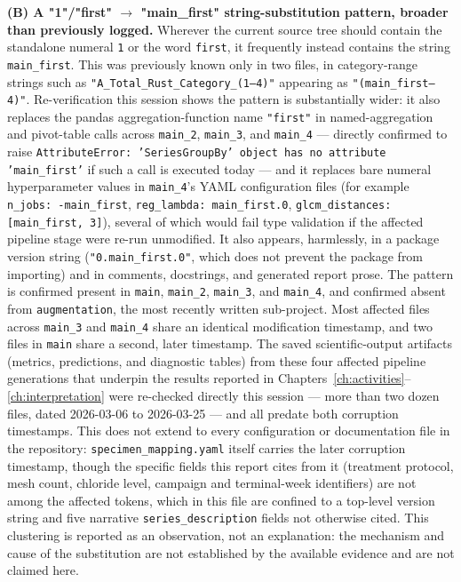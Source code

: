 \textbf{(B) A "1"/"first" $\rightarrow$ "main\_first" string-substitution
pattern, broader than previously logged.} Wherever the current source
tree should contain the standalone numeral \texttt{1} or the word
\texttt{first}, it frequently instead contains the string
\texttt{main\_first}. This was previously known only in two files, in
category-range strings such as \texttt{"A\_Total\_Rust\_Category\_(1--4)"}
appearing as \texttt{"(main\_first--4)"}. Re-verification this session
shows the pattern is substantially wider: it also replaces the pandas
aggregation-function name \texttt{"first"} in named-aggregation and
pivot-table calls across \texttt{main\_2}, \texttt{main\_3}, and
\texttt{main\_4} — directly confirmed to raise
\texttt{AttributeError: 'SeriesGroupBy' object has no attribute
'main\_first'} if such a call is executed today — and it replaces bare
numeral hyperparameter values in \texttt{main\_4}'s YAML configuration
files (for example \texttt{n\_jobs: -main\_first}, \texttt{reg\_lambda:
main\_first.0}, \texttt{glcm\_distances: [main\_first, 3]}), several of
which would fail type validation if the affected pipeline stage were
re-run unmodified. It also appears, harmlessly, in a package version
string (\texttt{"0.main\_first.0"}, which does not prevent the package
from importing) and in comments, docstrings, and generated report prose.
The pattern is confirmed present in \texttt{main}, \texttt{main\_2},
\texttt{main\_3}, and \texttt{main\_4}, and confirmed absent from
\texttt{augmentation}, the most recently written sub-project. Most
affected files across \texttt{main\_3} and \texttt{main\_4} share an
identical modification timestamp, and two files in \texttt{main} share a
second, later timestamp. The saved scientific-output artifacts (metrics,
predictions, and diagnostic tables) from these four affected pipeline
generations that underpin the results reported in
Chapters~\ref{ch:activities}--\ref{ch:interpretation} were re-checked
directly this session — more than two dozen files, dated 2026-03-06 to
2026-03-25 — and all predate both corruption timestamps. This does not
extend to every configuration or documentation file in the repository:
\texttt{specimen\_mapping.yaml} itself carries the later corruption
timestamp, though the specific fields this report cites from it (treatment
protocol, mesh count, chloride level, campaign and terminal-week
identifiers) are not among the affected tokens, which in this file are
confined to a top-level version string and five narrative
\texttt{series\_description} fields not otherwise cited. This clustering
is reported as an observation, not an explanation: the mechanism and cause
of the substitution are not established by the available evidence and are
not claimed here.

